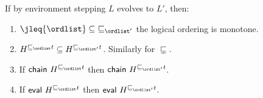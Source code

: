 

\begin{lemma}\label{lem:menvs}
If by environment stepping $L$ evolves to $L'$, then:
\begin{enumerate}
 \item\label{lem:menvs:jleq} $ \jleq{\ordlist} \subseteq\ \jleqP$ \ie the
 logical ordering is monotone.

 \item \label{lem:menvs:drs} $H^{\hbox{}\sqsubseteq_\ordlist
 t} \subseteq H^{\hbox{}\sqsubseteq_{\ordlist'} t}$. 
%
Similarly for $\sqsubsetneq$.
 
 \item \label{lem:menvs:chain} If $\mathsf{chain}\
 H^{\hbox{}\sqsubseteq_\ordlist t}$ then $\mathsf{chain}\
 H^{\hbox{}\sqsubseteq_{\ordlist'} t}$.

 \item \label{lem:menvs:eval} If $\mathsf{eval}\
 H^{\hbox{}\sqsubseteq_\ordlist t}$ then $\mathsf{eval}\
 H^{\hbox{}\sqsubseteq_{\ordlist'} t}$.
\end{enumerate}
\end{lemma}
%
%


